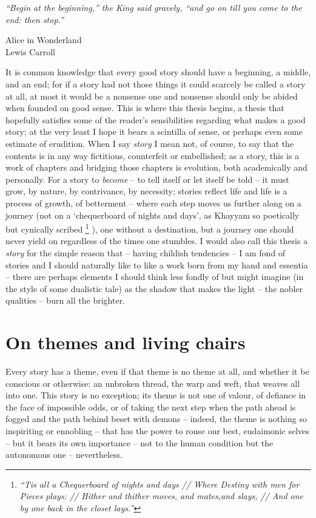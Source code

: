 \epigraph{
    \emph{
        ``Begin at the beginning,'' the King said gravely, ``and go on till you come to the end:
        then stop.''
} 
%
}
{Alice in Wonderland\\Lewis Carroll}
%
\noindent It is common knowledge that every good story should have a beginning, a middle, and an
end; for if a story had not those things it could scarcely be called a story at all, at most it
would be a nonsense one and nonsense should only be abided when founded on good sense.
%
This is where this thesis begins, a thesis that hopefully satisfies some of the reader's
sensibilities regarding what makes a good story; at the very least I hope it bears a scintilla of
sense, or perhaps even some estimate of erudition.
%
When I say \emph{story} I mean not, of course, to say that the contents is in any way
fictitious, counterfeit or embellished; as a story, this is a work of chapters and
bridging those chapters is evolution, both academically and personally.
%
For a story to \emph{become} -- to tell itself or let itself be told -- it must grow, by nature, by
contrivance, by necessity; stories reflect life and life is a process of growth, of betterment --
where each step moves us further along on a journey (not on a `chequerboard of nights and days', as
Khayyam so poetically but cynically scribed
%
\footnote{
    \emph{
        “Tis all a Chequerboard of nights and days //
        Where Destiny with men for Pieces plays: //
        Hither and thither moves, and mates,and slays, //
        And one by one back in the closet lays.”
    }
}
%
), one without a destination, but a journey one should
never yield on regardless of the times one stumbles.
%
I would also call this thesis a \emph{story} for the simple reason that -- having childish
tendencies -- I am fond of stories and I should naturally like to like a work born from my hand and
essentia -- there are perhaps elements I should think less fondly of but might imagine (in the
style of some dualistic tale) as the shadow that makes the light -- the nobler qualities -- burn
all the brighter.

\section{On themes and living chairs}
%
Every story has a theme, even if that theme is no theme at all, and whether it be conscious or
otherwise: an unbroken thread, the warp and weft, that weaves all into one.
%
This story is no exception; its theme is not one of valour, of defiance in the face of impossible
odds, or of taking the next step when the path ahead is fogged and the path behind beset with
demons -- indeed, the theme is nothing so inspiriting or ennobling -- that has the power to rouse
our best, eudaimonic selves -- but it bears its own importance -- not to the human condition but
the autonomous one -- nevertheless.

